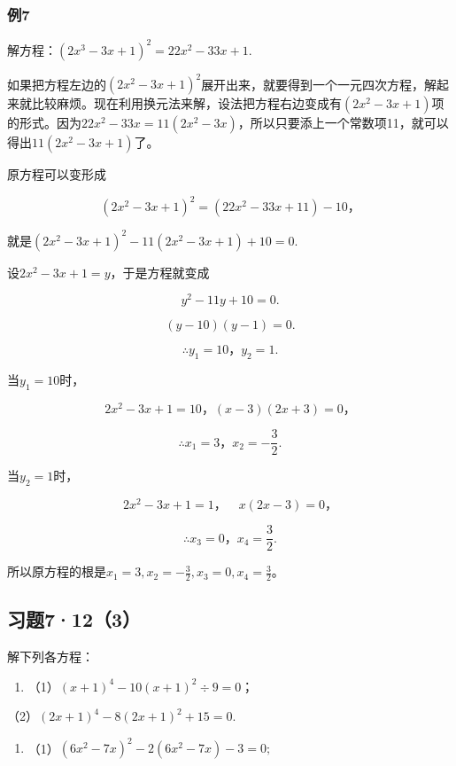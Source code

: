 \subsubsection{例7}

解方程：\((2x^{3} - 3x + 1)^{2} = 22x^{2} - 33x + 1.\)

如果把方程左边的\((2x^{2} - 3x + 1)^{2}\)展开出来，就要得到一个一元四次方程，解起来就比较麻烦。现在利用换元法来解，设法把方程右边变成有\((2x^{2} - 3x + 1)\)项的形式。因为\(22x^{2} - 33x = 11(2x^{2} - 3x)\)，所以只要添上一个常数项11，就可以得出\(11(2x^{2} - 3x + 1)\)了。

 原方程可以变形成

\[
(2 x ^ {2} - 3 x + 1) ^ {2} = (22 x ^ {2} - 33 x + 11) - 10\text{，}
\]

就是\((2x^{2} - 3x + 1)^{2} - 11(2x^{2} - 3x + 1) + 10 = 0.\)

设\(2x^{2} - 3x + 1 = y\)，于是方程就变成

\[
y ^ {2} - 11 y + 10 = 0.
\]

\[
(y - 10) (y - 1) = 0.
\]

\[
\therefore y _ {1} = 10\text{，} y _ {2} = 1.
\]

当\(y_{1} = 10\)时，

\[
2 x ^ {2} - 3 x + 1 = 10\text{，} (x - 3) (2 x + 3) = 0\text{，}
\]

\[
\therefore x _ {1} = 3\text{，} x _ {2} = - \frac{3}{2}.
\]

当\(y_{2} = 1\)时，

\[
2 x ^ {2} - 3 x + 1 = 1\text{，} \quad x (2 x - 3) = 0\text{，}
\]

\[
\therefore x _ {3} = 0\text{，} x _ {4} = \frac{3}{2}.
\]

所以原方程的根是\(x_{1} = 3, x_{2} = -\frac{3}{2}, x_{3} = 0, x_{4} = \frac{3}{2}\)。

\subsection{习题7·12（3）}

解下列各方程：

\begin{enumerate}
\item
  （1）\((x + 1)^{4} - 10(x + 1)^{2} \div 9 = 0\)；
\end{enumerate}

（2）\((2x + 1)^{4} - 8(2x + 1)^{2} + 15 = 0.\)

\begin{enumerate}[start=2]
\item
  （1）\((6x^{2} - 7x)^{2} - 2(6x^{2} - 7x) - 3 = 0;\)
\end{enumerate}

